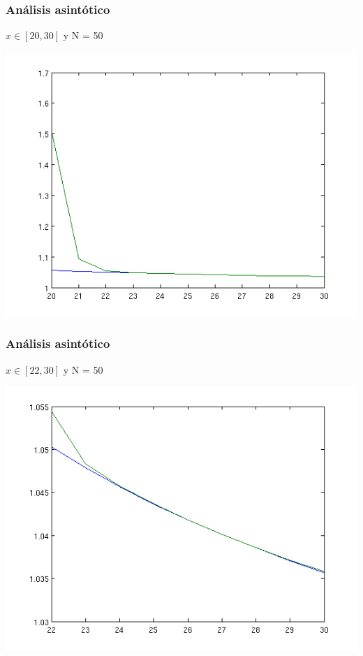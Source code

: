 \documentclass{beamer}
\begin{document}
\frame
{
\frametitle{Análisis asintótico}
$x \in [20,30]$ y N = 50

\begin{center}
\includegraphics[scale=0.5]{../informe/images/2b.png}
\end{center}
}

\frame
{
\frametitle{Análisis asintótico}
$x \in [22,30]$ y N = 50

\begin{center}
\includegraphics[scale=0.5]{../informe/images/2c.png}
\end{center}
}
\end{document}
